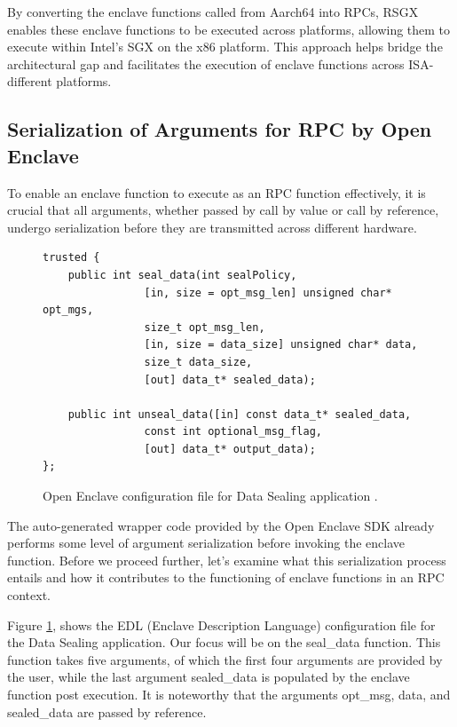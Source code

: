 \documentclass[article, doublespace,nopageskip]{VTthesis} %
\newcommand{\monitor}{RSGX \xspace}
\begin{document}
    By converting the enclave functions called from Aarch64 into RPCs, \monitor enables these enclave functions to be executed across platforms, allowing them to execute within Intel's SGX on the x86 platform. This approach helps bridge the architectural gap and facilitates the execution of enclave functions across ISA-different platforms. 

    \subsection{Serialization of Arguments for RPC by Open Enclave}
    To enable an enclave function to execute as an RPC function effectively, it is crucial that all arguments, whether passed by call by value or call by reference, undergo serialization before they are transmitted across different hardware.

    \begin{figure}
    \begin{tcolorbox}
    \begin{verbatim}
trusted {
    public int seal_data(int sealPolicy,
                [in, size = opt_msg_len] unsigned char* opt_mgs,
                size_t opt_msg_len,
                [in, size = data_size] unsigned char* data,
                size_t data_size,
                [out] data_t* sealed_data);

    public int unseal_data([in] const data_t* sealed_data,
                const int optional_msg_flag,
                [out] data_t* output_data);
};
    \end{verbatim}
    \end{tcolorbox}
    \caption{Open Enclave configuration file for Data Sealing application \cite{Data-Sealing}.}
    \label{fig:Data Sealing oe config}
    \end{figure}
    
    The auto-generated wrapper code provided by the Open Enclave SDK already performs
    some level of argument serialization before invoking the enclave function. Before we proceed further, let’s examine what this serialization process entails and how it contributes to the functioning of enclave functions in an RPC context.

     Figure \ref{fig:Data Sealing oe config}, shows the EDL (Enclave Description Language) configuration file for the Data Sealing application. Our focus will be on the seal\_data function. This function takes five arguments, of which the first four arguments are provided by the user, while the last argument sealed\_data is populated by the enclave function post execution. It is noteworthy that the arguments opt\_msg, data, and sealed\_data are passed by reference.
\end{document}
